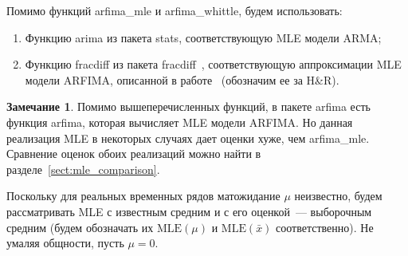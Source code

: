 \documentclass[specialist,
substylefile = spbu_report.rtx,
subf,href,colorlinks=true, 12pt]{disser}
\theoremstyle{definition}
\newtheorem{remark}{Замечание}[chapter]
\begin{document}
Помимо функций \textsf{arfima\_mle} и \textsf{arfima\_whittle}, будем использовать:
\begin{enumerate}
	\item Функцию \textsf{arima} из пакета \textsf{stats}, соответствующую MLE модели ARMA;
	\item Функцию \textsf{fracdiff} из пакета \textsf{fracdiff}~\cite{fracdiff}, соответствующую аппроксимации MLE модели ARFIMA, описанной в работе~\cite{Haslett1989} (обозначим ее за H\&R).
\end{enumerate}
\begin{remark}
	Помимо вышеперечисленных функций, в пакете \textsf{arfima} есть функция \textsf{arfima}, которая вычисляет MLE модели ARFIMA. Но данная реализация MLE в некоторых случаях дает оценки хуже, чем \textsf{arfima\_mle}. Сравнение оценок обоих реализаций можно найти в разделе~\ref{sect:mle_comparison}.
\end{remark}
Поскольку для реальных временных рядов матожидание $\mu$ неизвестно, будем рассматривать MLE с известным средним и с его оценкой~--- выборочным средним (будем обозначать их $\mathrm{MLE}(\mu)$ и $\mathrm{MLE}(\bar x)$ соответственно). Не умаляя общности, пусть $\mu=0$.
\end{document}
